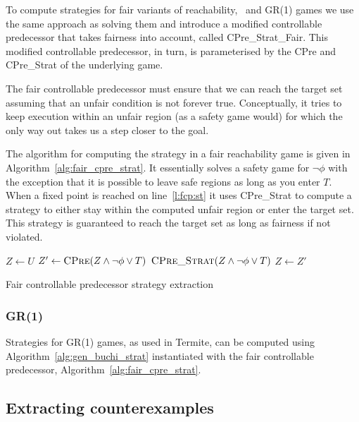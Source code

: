 To compute strategies for fair variants of reachability, \buchi\ and GR(1) games we use the same approach as solving them and introduce a modified controllable predecessor that takes fairness into account, called CPre\_Strat\_Fair. This modified controllable predecessor, in turn, is parameterised by the CPre and CPre\_Strat of the underlying game.

The fair controllable predecessor must ensure that we can reach the target set assuming that an unfair condition is not forever true. Conceptually, it tries to keep execution within an unfair region (as a safety game would) for which the only way out takes us a step closer to the goal. 

The algorithm for computing the strategy in a fair reachability game is given in Algorithm~\ref{alg:fair_cpre_strat}. It essentially solves a safety game for $\neg\phi$ with the exception that it is possible to leave safe regions as long as you enter $T$. When a fixed point is reached on line~\ref{l:fcp:st} it uses CPre\_Strat to compute a strategy to either stay within the computed unfair region or enter the target set. This strategy is guaranteed to reach the target set as long as fairness if not violated.

\begin{algorithm}
\begin{algorithmic}[1]

    \State $Z \gets U$
    \Loop
        \State $Z' \gets \Call{CPre}{Z \wedge \neg\phi \vee T}$
        \State\Return $\Call{CPre\_Strat}{Z \wedge \neg\phi \vee T}$ \label{l:fcp:st}
        \EndIf
        \State $Z \gets Z'$
    \EndLoop
\EndFunction

\end{algorithmic}
\caption{Fair controllable predecessor strategy extraction}
\label{alg:fair_cpre_strat}
\end{algorithm}

\subsubsection{GR(1)}

Strategies for GR(1) games, as used in Termite, can be computed using Algorithm~\ref{alg:gen_buchi_strat} instantiated with the fair controllable predecessor, Algorithm~\ref{alg:fair_cpre_strat}.

\subsection{Extracting counterexamples}


